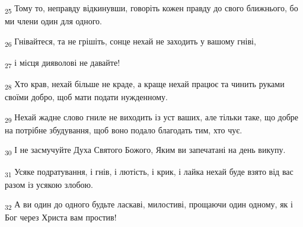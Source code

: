 \begin{tcolorbox}
\textsubscript{25} Тому то, неправду відкинувши, говоріть кожен правду до свого ближнього, бо ми члени один для одного.
\end{tcolorbox}
\begin{tcolorbox}
\textsubscript{26} Гнівайтеся, та не грішіть, сонце нехай не заходить у вашому гніві,
\end{tcolorbox}
\begin{tcolorbox}
\textsubscript{27} і місця дияволові не давайте!
\end{tcolorbox}
\begin{tcolorbox}
\textsubscript{28} Хто крав, нехай більше не краде, а краще нехай працює та чинить руками своїми добро, щоб мати подати нужденному.
\end{tcolorbox}
\begin{tcolorbox}
\textsubscript{29} Нехай жадне слово гниле не виходить із уст ваших, але тільки таке, що добре на потрібне збудування, щоб воно подало благодать тим, хто чує.
\end{tcolorbox}
\begin{tcolorbox}
\textsubscript{30} І не засмучуйте Духа Святого Божого, Яким ви запечатані на день викупу.
\end{tcolorbox}
\begin{tcolorbox}
\textsubscript{31} Усяке подратування, і гнів, і лютість, і крик, і лайка нехай буде взято від вас разом із усякою злобою.
\end{tcolorbox}
\begin{tcolorbox}
\textsubscript{32} А ви один до одного будьте ласкаві, милостиві, прощаючи один одному, як і Бог через Христа вам простив!
\end{tcolorbox}
